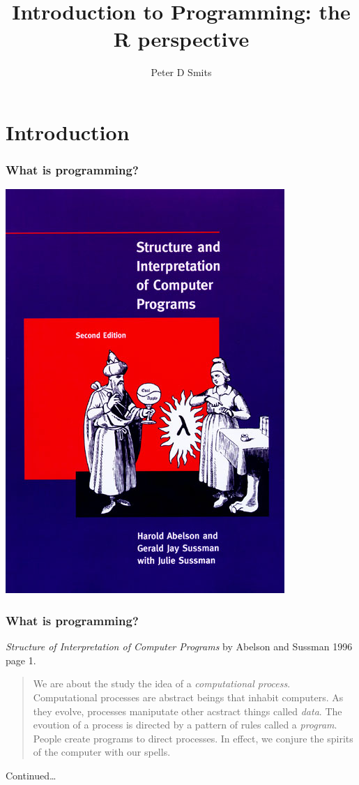 \documentclass{beamer}\usepackage{graphicx, color}
\title{Introduction to Programming: the R perspective}
\author{Peter D Smits}
\begin{document}
\begin{frame}
  \maketitle
\end{frame}

\section{Introduction}
\begin{frame}
  \frametitle{What is programming?}

  \begin{center}
    \includegraphics[height = 0.9\textheight, keepaspectratio = true]{figure/sicp}
  \end{center}

\end{frame}

\begin{frame}
  \frametitle{What is programming?}
  \textit{Structure of Interpretation of Computer Programs} by Abelson and Sussman 1996 page 1.

  \begin{quotation}
    We are about the study the idea of a \textit{computational process}. Computational processes are abstract beings that inhabit computers. As they evolve, processes maniputate other acstract things called \textit{data}. The evoution of a process is directed by a pattern of rules called a \textit{program}. People create programs to direct processes. In effect, we conjure the spirits of the computer with our spells.
  \end{quotation}

  Continued\ldots
\end{frame}
\end{document}
